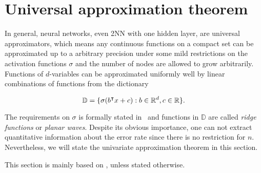 
\section{Universal approximation theorem}
\label{sec:uat}

In general, neural networks, even 2NN with one hidden layer, are universal
approximators, which means any continuous functions on a compact set can be
approximated up to a arbitrary precision under some mild restrictions on the
activation functions $\sigma$ and the number of nodes are allowed to grow
arbitrarily. Functions of $d$-variables can be approximated uniformly well by
linear combinations of functions from the dictionary

\begin{equation}
    \label{eq:uat_dict}
    \mathbb{D} = \{\sigma(b{}^{\intercal} x + c): b \in \mathbb{R}^d, c\in \mathbb{R} \}.
\end{equation}

The requirements on $\sigma$ is formally stated
in~\cite{cybenkoApproximationSuperpositionsSigmoidal1989} and functions in
$\mathbb{D}$ are called \textit{ridge functions} or \textit{planar waves}.
Despite its obvious importance, one can not extract quantitative information
about the error rate since there is no restriction for $n$. Nevertheless, we
will state the univariate approximation theorem in this section. 

This section is mainly based on
\cite{cybenkoApproximationSuperpositionsSigmoidal1989}, unless stated otherwise.


